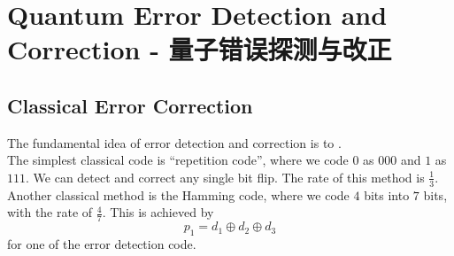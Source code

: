 \section{Quantum Error Detection and Correction - 量子错误探测与改正}
\subsection{Classical Error Correction}
The fundamental idea of error detection and correction is to . \\
The simplest classical code is ``repetition code'', where we code $0$ as $000$ and $1$ as $111$. We can detect and correct any single bit flip. The rate of this method is $\frac{1}{3}$. \\
Another classical method is the Hamming code, where we code $4$ bits into $7$ bits, with the rate of $\frac{4}{7}$. This is achieved by
$$p_1 = d_1 \oplus d_2 \oplus d_3$$
for one of the error detection code. \\

